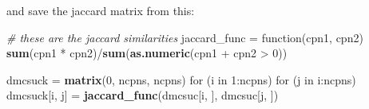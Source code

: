 \documentclass[10pt]{report}
\newenvironment{Shaded}{}{}
\newcommand{\KeywordTok}[1]{\textcolor[rgb]{0.00,0.44,0.13}{\textbf{{#1}}}}
\newcommand{\DataTypeTok}[1]{\textcolor[rgb]{0.56,0.13,0.00}{{#1}}}
\newcommand{\DecValTok}[1]{\textcolor[rgb]{0.25,0.63,0.44}{{#1}}}
\newcommand{\StringTok}[1]{\textcolor[rgb]{0.25,0.44,0.63}{{#1}}}
\newcommand{\CommentTok}[1]{\textcolor[rgb]{0.38,0.63,0.69}{\textit{{#1}}}}
\newcommand{\OtherTok}[1]{\textcolor[rgb]{0.00,0.44,0.13}{{#1}}}
\newcommand{\NormalTok}[1]{{#1}}
\begin{document}
\begin{Shaded}
\end{Shaded}

and save the jaccard matrix from this:

\begin{Shaded}
\begin{Highlighting}[]
\CommentTok{# these are the jaccard similarities}
\NormalTok{jaccard_func =}\StringTok{ }\NormalTok{function(cpn1, cpn2) }\KeywordTok{sum}\NormalTok{(cpn1 *}\StringTok{ }\NormalTok{cpn2)/}\KeywordTok{sum}\NormalTok{(}\KeywordTok{as.numeric}\NormalTok{(cpn1 +}\StringTok{ }\NormalTok{cpn2 >}\StringTok{ }
\StringTok{    }\DecValTok{0}\NormalTok{))}

\NormalTok{dmcsuck =}\StringTok{ }\KeywordTok{matrix}\NormalTok{(}\DecValTok{0}\NormalTok{, ncpns, ncpns)}
\NormalTok{for (i in }\DecValTok{1}\NormalTok{:ncpns) for (j in i:ncpns) dmcsuck[i, j] =}\StringTok{ }\KeywordTok{jaccard_func}\NormalTok{(dmcsuc[i, }
    \NormalTok{], dmcsuc[j, ])}
\end{Highlighting}
\end{Shaded}
\end{document}
